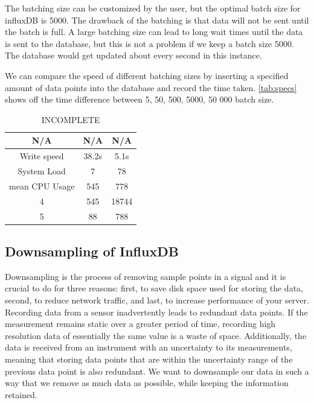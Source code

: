 \documentclass[main.tex]{subfiles}
\begin{document}
The batching size can be customized by the user, but the optimal batch size for influxDB is 5000\cite{influx_batching}. The drawback of the batching is that data will not be sent until the batch is full. A large batching size can lead to long wait times until the data is sent to the database, but this is not a problem if we keep a batch size 5000. The database would get updated about every second in this instance.

We can compare the speed of different batching sizes by inserting a specified amount of data points into the database and record the time taken. \autoref{tab:specs} shows off the time difference between 5, 50, 500, 5000, 50 000 batch size.

\begin{table}[h]
\centering
\begin{tabular}{||c c c||} 
 \hline
 N/A & N/A & N/A \\ [0.5ex] 
 \hline\hline
 Write speed & 38.2s & 5.1s \\ 
 \hline
 System Load & 7 & 78  \\
 \hline
 mean CPU Usage & 545 & 778 \\
 \hline
 4 & 545 & 18744\\
 \hline
 5 & 88 & 788\\ [1ex] 
 \hline

\end{tabular}
\caption{\label{tab:specs} INCOMPLETE}
\end{table}
\FloatBarrier


 
 
 \subsection{Downsampling of InfluxDB}
 \label{ssec: downsampling}

 Downsampling is the process of removing sample points in a signal and it is crucial to do for three reasons: first, to save disk space used for storing the data, second, to reduce network traffic, and last, to increase performance of your server. Recording data from a sensor inadvertently leads to redundant data points. If the measurement remains static over a greater period of time, recording high resolution data of essentially the same value is a waste of space. Additionally, the data is received from an instrument with an uncertainty to its measurements, meaning that storing data points that are within the uncertainty range of the previous data point is also redundant. We want to downsample our data in such a way that we remove as much data as possible, while keeping the information retained.
 
\end{document}
